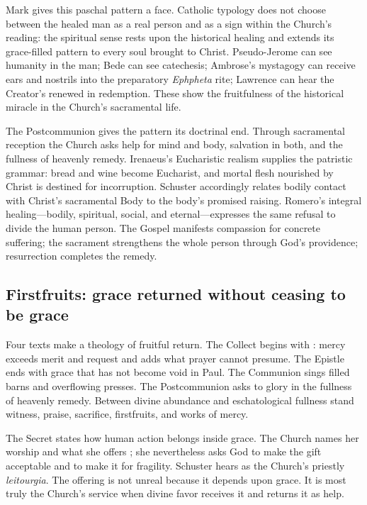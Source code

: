 Mark gives this paschal pattern a face. Catholic typology does not choose
between the healed man as a real person and as a sign within the Church's
reading: the spiritual sense rests upon the historical healing and extends its
grace-filled pattern to every soul brought to Christ. Pseudo-Jerome can see
humanity in the man; Bede can see catechesis; Ambrose's mystagogy can receive
ears and nostrils into the preparatory \emph{Ephpheta} rite; Lawrence can hear
the Creator's  renewed in redemption. These show the
fruitfulness of the historical miracle in the Church's sacramental life.

The Postcommunion gives the pattern its doctrinal end. Through sacramental
reception the Church asks help for mind and body, salvation in both, and the
fullness of heavenly remedy. Irenaeus's Eucharistic realism supplies the
patristic grammar: bread and wine become Eucharist, and mortal flesh nourished
by Christ is destined for incorruption. Schuster accordingly relates bodily
contact with Christ's sacramental Body to the body's promised raising. Romero's
integral healing---bodily, spiritual, social, and eternal---expresses the same
refusal to divide the human person. The Gospel manifests compassion for
concrete suffering; the sacrament strengthens the whole person through God's
providence; resurrection completes the remedy.

\subsection*{Firstfruits: grace returned without ceasing to be grace}

Four texts make a theology of fruitful return. The Collect begins with
: mercy exceeds merit and request and adds what
prayer cannot presume. The Epistle ends with grace that has not become void in
Paul. The Communion sings filled barns and overflowing presses. The
Postcommunion asks to glory in the fullness of heavenly remedy. Between divine
abundance and eschatological fullness stand witness, praise, sacrifice,
firstfruits, and works of mercy.

The Secret states how human action belongs inside grace. The Church names her
worship  and what she offers ; she nevertheless
asks God to make the gift acceptable and to make it  for
fragility. Schuster hears  as the Church's priestly
\emph{leitourgia}. The offering is not unreal because it depends upon grace.
It is most truly the Church's service when divine favor receives it and returns
it as help.

